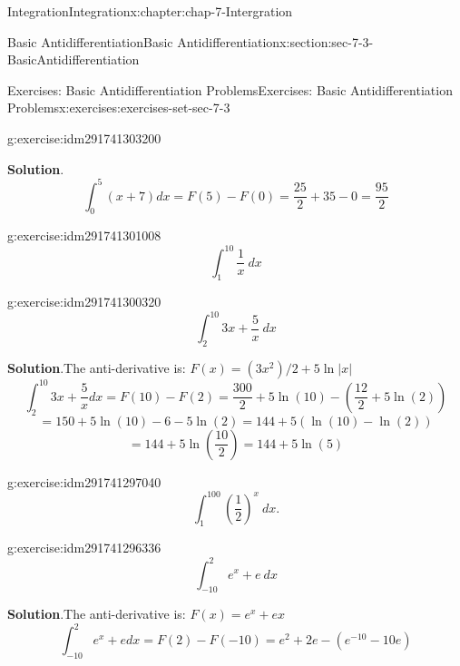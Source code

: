 \documentclass[oneside,10pt,]{book}
\numberwithin{equation}{section}
\begin{document}
\begin{chapterptx}{Integration}{}{Integration}{}{}{x:chapter:chap-7-Intergration}
\begin{sectionptx}{Basic Antidifferentiation}{}{Basic Antidifferentiation}{}{}{x:section:sec-7-3-BasicAntidifferentiation}
\begin{exercises-subsection}{Exercises: Basic Antidifferentiation Problems}{}{Exercises: Basic Antidifferentiation Problems}{}{}{x:exercises:exercises-set-sec-7-3}
\begin{divisionexercise}{7}{}{}{g:exercise:idm291741303200}
\par\smallskip%
\noindent\textbf{Solution}.\hypertarget{g:solution:idm291741301744}{}\quad{}%
\begin{equation*}
\int_0^5 (x+7)dx=F(5)- F(0)=\frac{25}{2}+35-0=\frac{95}{2}
\end{equation*}
\end{divisionexercise}%
\begin{divisionexercise}{8}{}{}{g:exercise:idm291741301008}%
%
\begin{equation*}
\int_1^{10}\frac{1}{x}\  dx
\end{equation*}
\end{divisionexercise}%
\begin{divisionexercise}{9}{}{}{g:exercise:idm291741300320}%
%
\begin{equation*}
\int_2^{10} 3x+\frac{5}{x}\  dx
\end{equation*}
\par\smallskip%
\noindent\textbf{Solution}.\hypertarget{g:solution:idm291741299760}{}\quad{}The anti-derivative is: \(F(x)=(3x^2)/2+5 \ln|x|\)%
%
\begin{equation*}
\int_2^{10} 3x+\frac{5}{x}  dx =F(10)-F(2)
=\frac{300}{2}+5 \ln(10)-\left(\frac{12}{2}+5 \ln(2) \right)
\end{equation*}
%
\begin{equation*}
=150+5 \ln(10)-6-5 \ln(2)=144+5(\ln(10)-\ln(2) )
\end{equation*}
%
\begin{equation*}
= 144+5 \ln\left(\frac{10}{2}\right)=144+5 \ln(5)
\end{equation*}
\end{divisionexercise}%
\begin{divisionexercise}{10}{}{}{g:exercise:idm291741297040}%
%
\begin{equation*}
\int_1^{100}\left(\frac{1}{2}\right)^x\   dx.
\end{equation*}
\end{divisionexercise}%
\begin{divisionexercise}{11}{}{}{g:exercise:idm291741296336}%
%
\begin{equation*}
\int_{-10}^2 e^x+e \  dx
\end{equation*}
\par\smallskip%
\noindent\textbf{Solution}.\hypertarget{g:solution:idm291741295792}{}\quad{}The anti-derivative is: \(F(x)=e^x+e x\)%
%
\begin{equation*}
\int_{-10}^2 e^x+e  dx =F(2)-F(-10)=e^2+2e-(e^{-10}-10 e)
\end{equation*}

\end{divisionexercise}
\end{exercises-subsection}
\end{sectionptx}
\end{chapterptx}
\end{document}
